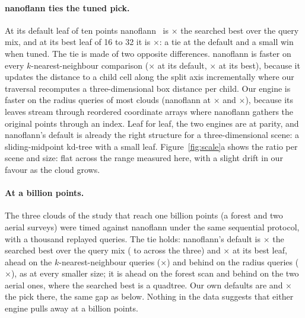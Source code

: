 \paragraph{nanoflann ties the tuned pick.} At its default leaf of ten points nanoflann~\cite{blanco2014nanoflann} is \nanoflannDefaultAll$\times$ the searched best over the query mix, and at its best leaf of 16 to 32 it is \nanoflannBestAll$\times$: a tie at the default and a small win when tuned. The tie is made of two opposite differences. nanoflann is faster on every $k$-nearest-neighbour comparison (\nanoflannDefaultKnn$\times$ at its default, \nanoflannBestKnn$\times$ at its best), because it updates the distance to a child cell along the split axis incrementally where our traversal recomputes a three-dimensional box distance per child. Our engine is faster on the radius queries of most clouds (nanoflann at \nanoflannDefaultRadius$\times$ and \nanoflannBestRadius$\times$), because its leaves stream through reordered coordinate arrays where nanoflann gathers the original points through an index. Leaf for leaf, the two engines are at parity, and nanoflann's default is already the right structure for a three-dimensional scene: a sliding-midpoint kd-tree with a small leaf. Figure~\ref{fig:scale}a shows the ratio per scene and size: flat across the range measured here, with a slight drift in our favour as the cloud grows.

\paragraph{At a billion points.} The three clouds of the study that reach one billion points (a forest and two aerial surveys) were timed against nanoflann under the same sequential protocol, with a thousand replayed queries. The tie holds: nanoflann's default is \anchorNanoflannDefaultAll$\times$ the searched best over the query mix (\anchorNanoflannDefaultMin{} to \anchorNanoflannDefaultMax{} across the three) and \anchorNanoflannBestAll$\times$ at its best leaf, ahead on the $k$-nearest-neighbour queries (\anchorNanoflannDefaultKnn$\times$) and behind on the radius queries (\anchorNanoflannDefaultRadius$\times$), as at every smaller size; it is ahead on the forest scan and behind on the two aerial ones, where the searched best is a quadtree. Our own defaults are \anchorOursOctreeDefault{} and \anchorOursKdDefault$\times$ the pick there, the same gap as below. Nothing in the data suggests that either engine pulls away at a billion points.

